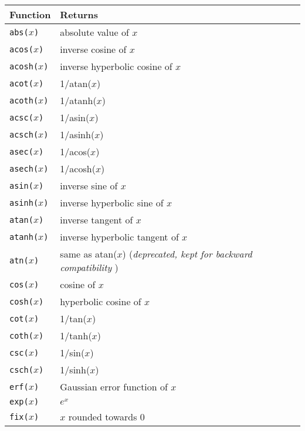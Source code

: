 \vspace{2ex}

\begin{supertabular}{ll} \hline
Function & Returns  \\ \hline
{\tt abs($x$)}          	& absolute value of $x$ \\
{\tt acos($x$)}        	& inverse cosine of $x$ \\
{\tt acosh($x$)}      	& inverse hyperbolic cosine of $x$ \\
{\tt acot($x$)}        	& 1/atan($x$) \\
{\tt acoth($x$)}      	& 1/atanh($x$) \\
{\tt acsc($x$)} 	     	& 1/asin($x$) \\
{\tt acsch($x$)}      	& 1/asinh($x$) \\
{\tt asec($x$)}        	& 1/acos($x$) \\
{\tt asech($x$)}      	& 1/acosh($x$) \\
{\tt asin($x$)}        	& inverse sine of $x$ \\
{\tt asinh($x$)}      	& inverse hyperbolic sine of $x$\\
{\tt atan($x$)}        	& inverse tangent of $x$ \\
{\tt atanh($x$)}      	& inverse hyperbolic tangent of $x$ \\
{\tt atn($x$)}          	& same as atan($x$) ({\it deprecated, kept for backward compatibility} ) \\
{\tt cos($x$)}          	& cosine of $x$ \\
{\tt cosh($x$)}        	& hyperbolic cosine of $x$ \\
{\tt cot($x$)}          	& 1/tan($x$) \\
{\tt coth($x$)}        	& 1/tanh($x$) \\
{\tt csc($x$)}             & 1/sin($x$) \\
{\tt csch($x$)}        	& 1/sinh($x$) \\
{\tt erf($x$)}          	& Gaussian error function of $x$ \\
{\tt exp($x$)}          	& $e^x$  \\
{\tt fix($x$)}          	& $x$ rounded towards 0 \\

\end{supertabular}

